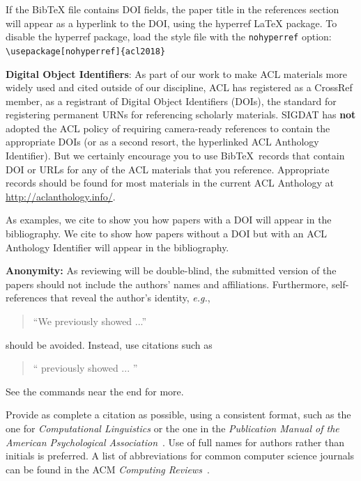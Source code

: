 \documentclass[11pt,a4paper]{article}
\newcommand\conforg{SIGDAT}
\begin{document}
If the Bib\TeX{} file contains DOI fields, the paper
title in the references section will appear as a hyperlink
to the DOI, using the hyperref \LaTeX{} package.
To disable the hyperref package, load the style file
with the \verb|nohyperref| option: \\{\small
\verb|\usepackage[nohyperref]{acl2018}|}


\textbf{Digital Object Identifiers}: As part of our work to make ACL
materials more widely used and cited outside of our discipline, ACL
has registered as a CrossRef member, as a registrant of Digital Object
Identifiers (DOIs), the standard for registering permanent URNs for
referencing scholarly materials. \conforg{} has \textbf{not} adopted the
ACL policy of requiring camera-ready references to contain the appropriate
  DOIs (or as a second resort, the hyperlinked ACL Anthology
  Identifier). But we certainly encourage you to use
  Bib\TeX\ records that contain DOI or URLs for any of the ACL
  materials that you reference. Appropriate records should be found
for most materials in the current ACL Anthology at
\url{http://aclanthology.info/}.

As examples, we cite \cite{P16-1001} to show you how papers with a DOI
will appear in the bibliography.  We cite \cite{C14-1001} to show how
papers without a DOI but with an ACL Anthology Identifier will appear
in the bibliography.  

\textbf{Anonymity:} As reviewing will be double-blind, the submitted
version of the papers should not include the authors' names and
affiliations. Furthermore, self-references that reveal the author's
identity, {\em e.g.},
\begin{quote}
``We previously showed \cite{Gusfield:97} ...''  
\end{quote}
should be avoided. Instead, use citations such as 
\begin{quote}
``\citeauthor{Gusfield:97} 
previously showed ... ''
\end{quote}

See the \verb|| commands near the end for more.

Provide as complete a citation as possible, using a consistent format,
such as the one for {\em Computational Linguistics\/} or the one in the 
{\em Publication Manual of the American 
Psychological Association\/}~\cite{APA:83}. Use of full names for
authors rather than initials is preferred. A list of abbreviations
for common computer science journals can be found in the ACM 
{\em Computing Reviews\/}~\cite{ACM:83}.
\end{document}
